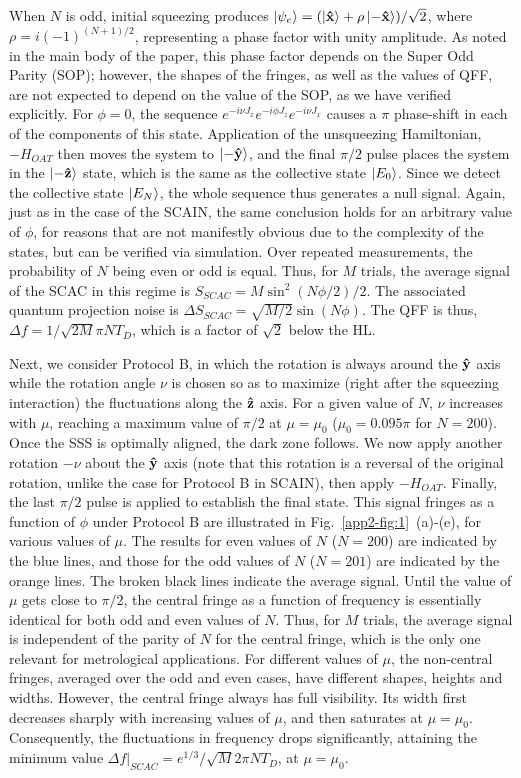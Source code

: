 \documentclass[aps,pra,letterpaper,superscriptaddress,showpacs,amsmath,floats,twocolumn]{revtex4-1}
\begin{document}
When $N$ is odd, initial squeezing produces $\ket{\psi_e}=(\ket{\vu{x}} +\rho \ket{-\vu{x}})/\sqrt{2}$, where $\rho=i(-1)^{(N+1)/2}$, representing a phase factor with unity amplitude. As noted in the main body of the paper, this phase factor depends on the Super Odd Parity (SOP); however, the shapes of the fringes, as well as the values of QFF, are not expected to depend on the value of the SOP, as we have verified explicitly. For $\phi=0$, the sequence $e^{-i\nu J_x}e^{-i\phi J_z}e^{-i\nu J_x}$ causes a $\pi$ phase-shift in each of the components of this state. Application of the unsqueezing Hamiltonian, $-H_{OAT}$ then moves the system to $\ket{-\vu{y}}$, and the final $\pi/2$ pulse places the system in the $\ket{-\vu{z}}$ state, which is the same as the collective state $\ket{E_0}$. Since we detect the collective state $\ket{E_N}$, the whole sequence thus generates a null signal. Again, just as in the case of the SCAIN, the same conclusion holds for an arbitrary value of $\phi$, for reasons that are not manifestly obvious due to the complexity of the states, but can be verified via simulation. Over repeated measurements, the probability of $N$ being even or odd is equal. Thus, for $M$ trials, the average signal of the SCAC in this regime is $S_{SCAC}=M\sin^2(N\phi/2)/2$. The associated quantum projection noise is $\Delta S_{SCAC}=\sqrt{M/2}\sin(N\phi)$. The QFF is thus, $\Delta f=1/\sqrt{2M}\pi NT_D$, which is a factor of $\sqrt{2}$ below the HL.

Next, we consider Protocol B, in which the rotation is always around the $\vu{y}$ axis while the rotation angle $\nu$ is chosen so as to maximize (right after the squeezing interaction) the fluctuations along the $\vu{z}$ axis. For a given value of $N$, $\nu$ increases with $\mu$, reaching a maximum value of $\pi/2$ at $\mu=\mu_0$ ($\mu_0=0.095\pi$ for $N=200$). Once the SSS is optimally aligned, the dark zone follows. We now apply another rotation $-\nu$ about the $\vu{y}$ axis (note that this rotation is a reversal of the original rotation, unlike the case for Protocol B in SCAIN), then apply $-H_{OAT}$. Finally, the last $\pi/2$ pulse is applied to establish the final state. This signal fringes as a function of $\phi$ under Protocol B are illustrated in Fig.~\ref{app2-fig:1}~(a)-(e), for various values of $\mu$. The results for even values of $N$ ($N=200$) are indicated by the blue lines, and those for the odd values of $N$ ($N=201$) are indicated by the orange lines. The broken black lines indicate the average signal. Until the value of $\mu$ gets close to $\pi/2$, the central fringe as a function of frequency is essentially identical for both odd and even values of $N$. Thus, for $M$ trials, the average signal is independent of the parity of $N$ for the central fringe, which is the only one relevant for metrological applications. For different values of $\mu$, the non-central fringes, averaged over the odd and even cases, have different shapes, heights and widths. However, the central fringe always has full visibility. Its width first decreases sharply with increasing values of $\mu$, and then saturates at $\mu=\mu_0$. Consequently, the fluctuations in frequency drops significantly, attaining the minimum value $\Delta f|_{SCAC}=e^{1/3}/\sqrt{M}2\pi N T_D$, at $\mu=\mu_0$.
\end{document}
